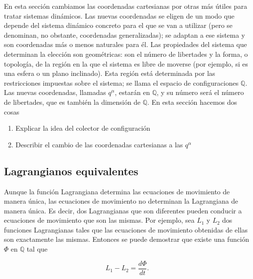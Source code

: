 En esta sección cambiamos las coordenadas cartesianas por otras más útiles para tratar sistemas dinámicos. Las nuevas coordenadas se eligen de un modo que depende del sistema dinámico concreto para el que se van a utilizar (pero se denominan, no obstante, coordenadas generalizadas); se adaptan a ese sistema y son coordenadas más o menos naturales para él. Las propiedades del sistema que determinan la elección son geométricas: son el número de libertades y la forma, o topología, de la región en la que el sistema es libre de moverse (por ejemplo, si es una esfera o un plano inclinado). Esta región está determinada por las restricciones impuestas sobre el sistema; se llama el espacio de configuraciones $\mathbb{Q}$. Las nuevas coordenadas, llamadas $q^{\alpha}$, estarán en $\mathbb{Q}$, y su número será el número de libertades, que es también la dimensión de $\mathbb{Q}$. En esta sección hacemos dos cosas 
\begin{enumerate}
  \item Explicar la idea del colector de configuración
  \item Describir el cambio de las coordenadas cartesianas a las $q^{\alpha}$
\end{enumerate}

\subsection{Lagrangianos equivalentes}



Aunque la función Lagrangiana determina las ecuaciones de movimiento de manera única, las ecuaciones de movimiento no determinan la Lagrangiana de manera única. Es decir, dos Lagrangianas que son diferentes pueden conducir a ecuaciones de movimiento que son las mismas. Por ejemplo, sea $L_{1}$ y $L_{2}$ dos funciones Lagrangianas tales que las ecuaciones de movimiento obtenidas de ellas son exactamente las mismas. Entonces se puede demostrar que existe una función $\Phi$ en $\mathbb{Q}$ tal que 

\[
L_{1}-L_{2}=\frac{d \Phi}{d t}.
\]

